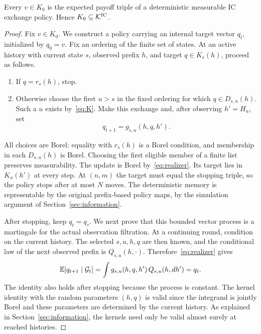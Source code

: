\documentclass[11pt]{extarticle}
\begin{document}
\begin{proposition}\label{prop:lower}
Every $v\in K_0$ is the expected payoff triple of a deterministic
measurable IC exchange policy. Hence $K_0\subseteq\mathcal{K}^{\mathrm{IC}}$.
\end{proposition}
\begin{proof}
Fix $v\in K_0$. We construct a policy carrying an internal target vector
$q_t$, initialized by $q_0=v$. Fix an ordering of the finite set of
states. At an active history with current state $s$, observed prefix
$h$, and target $q\in K_s(h)$, proceed as follows.
\begin{enumerate}
    \item If $q=r_s(h)$, stop.
    \item Otherwise choose the first $u>s$ in the fixed ordering for
    which $q\in D_{s,u}(h)$. Such a $u$ exists by~\eqref{eq:K}.
    Make this exchange and, after observing $h'=H_u$, set
    \begin{equation}
        q_{t+1}=g_{s,u}(h,q,h').
        \label{eq:update}
    \end{equation}
\end{enumerate}
All choices are Borel: equality with $r_s(h)$ is a Borel condition,
and membership in each $D_{s,u}(h)$ is Borel. Choosing the first
eligible member of a finite list preserves measurability. The update
is Borel by~\eqref{eq:realizer}. Its target lies in $K_u(h')$ at every
step. At $(n,m)$ the target must equal the stopping triple, so the
policy stops after at most $N$ moves. The deterministic memory is
representable by the original prefix-based policy maps, by the
simulation argument of Section~\ref{sec:information}.

After stopping, keep $q_t=q_\tau$. We next prove that this bounded
vector process is a martingale for the actual observation filtration.
At a continuing round, condition on the current history. The selected
$s,u,h,q$ are then known, and the conditional law of the next observed
prefix is $Q_{s,u}(h,\cdot)$. Therefore~\eqref{eq:realizer} gives
\begin{equation}
    \mathbb{E}[q_{t+1}\mid\mathcal{G}_t]
    =\int g_{s,u}(h,q,h')\,Q_{s,u}(h,dh')
    =q_t.
    \label{eq:martingale}
\end{equation}
The identity also holds after stopping because the process is constant.
The kernel identity with the random parameters $(h,q)$ is valid since
the integrand is jointly Borel and these parameters are determined by
the current history. As explained in Section~\ref{sec:information},
the kernels need only be valid almost surely at reached histories.


\end{proof}
\end{document}
